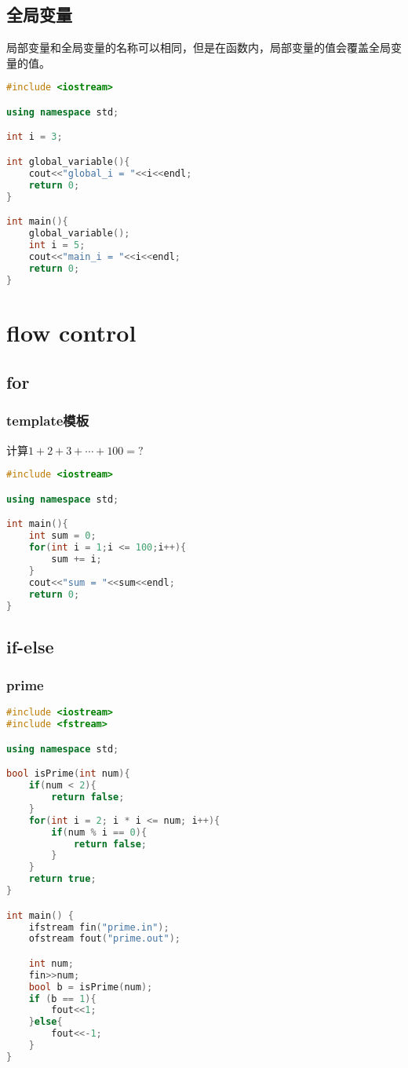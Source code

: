 \documentclass[12pt,twiside,a4paper]{ctexbook}
\numberwithin{chapter}{part}
\begin{document}
\section{全局变量}
局部变量和全局变量的名称可以相同，但是在函数内，局部变量的值会覆盖全局变量的值。
\begin{lstlisting}[language=C++]
#include <iostream>

using namespace std;

int i = 3;

int global_variable(){
	cout<<"global_i = "<<i<<endl;
	return 0;
}

int main(){
	global_variable();
	int i = 5;
	cout<<"main_i = "<<i<<endl;
	return 0;
}
\end{lstlisting}

\chapter{flow control}
\section{for}
\subsection{template模板}
计算$1+2+3+\cdots+100 = ?$
\begin{lstlisting}[language=C++]
#include <iostream>

using namespace std;

int main(){
	int sum = 0;
	for(int i = 1;i <= 100;i++){
		sum += i;
	}
	cout<<"sum = "<<sum<<endl;
	return 0;
}
\end{lstlisting}

\section{if-else}
\subsection{prime}
\begin{lstlisting}[language=C++]
#include <iostream>
#include <fstream>

using namespace std;

bool isPrime(int num){
	if(num < 2){
		return false;
	}
	for(int i = 2; i * i <= num; i++){
		if(num % i == 0){
			return false;
		}
	}
	return true;
}

int main() {
	ifstream fin("prime.in");
	ofstream fout("prime.out");

	int num;
	fin>>num;
	bool b = isPrime(num);
	if (b == 1){
		fout<<1;
	}else{
		fout<<-1;
	}
}
\end{lstlisting}
\end{document}
